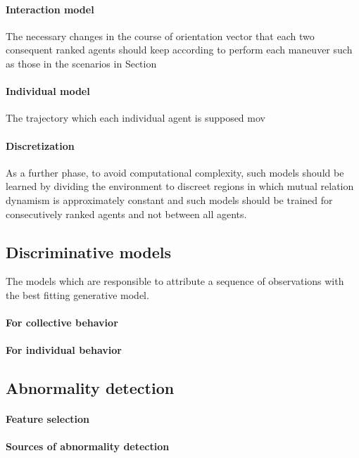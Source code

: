 \documentclass{article}
\begin{document}
			\paragraph{Interaction model}
			The necessary changes in the course of orientation vector that each two consequent ranked agents should keep according to perform each maneuver such as those in the scenarios in Section 
			\paragraph{Individual model}
			The trajectory which each individual agent is supposed mov
				
			\paragraph{Discretization} As a further phase, to avoid computational complexity, such models should be learned by dividing the environment to discreet regions in which mutual relation dynamism is approximately constant and such models should be trained for consecutively ranked agents and not between all agents.   
		
		\subsection{Discriminative models}
			The models which are responsible to attribute a sequence of observations with the best fitting generative model.
			\paragraph{For collective behavior}
			\paragraph{For individual behavior}
				
		
		\subsection{Abnormality detection}
			\paragraph{Feature selection}
			\paragraph{Sources of abnormality detection}
		
\end{document}
